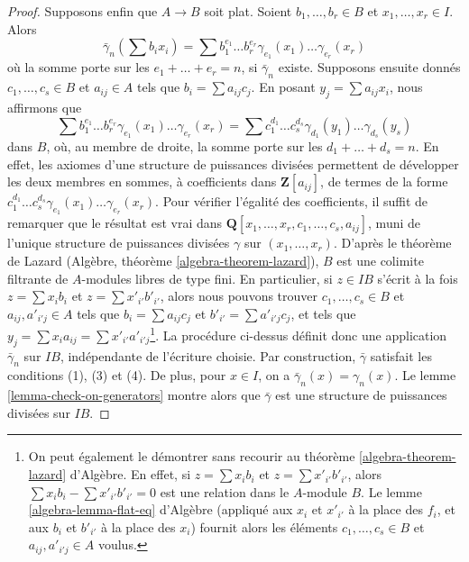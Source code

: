 \begin{proof}
Supposons enfin que $A \to B$ soit plat. Soient $b_1, \ldots, b_r \in B$ et
$x_1, \ldots, x_r \in I$. Alors
$$
\bar\gamma_n(\sum b_ix_i) =
\sum b_1^{e_1} \ldots b_r^{e_r} \gamma_{e_1}(x_1) \ldots \gamma_{e_r}(x_r)
$$
où la somme porte sur les $e_1 + \ldots + e_r = n$,
si $\bar\gamma_n$ existe. Supposons ensuite donnés $c_1, \ldots, c_s \in B$
et $a_{ij} \in A$ tels que $b_i = \sum a_{ij}c_j$. En posant $y_j = \sum a_{ij}x_i$, nous affirmons que
$$
\sum b_1^{e_1} \ldots b_r^{e_r} \gamma_{e_1}(x_1) \ldots \gamma_{e_r}(x_r) =
\sum c_1^{d_1} \ldots c_s^{d_s} \gamma_{d_1}(y_1) \ldots \gamma_{d_s}(y_s)
$$
dans $B$, où, au membre de droite, la somme porte sur les $d_1 + \ldots + d_s = n$. En effet, les axiomes d'une structure de puissances divisées permettent de développer les deux membres en sommes, à coefficients dans $\mathbf{Z}[a_{ij}]$, de termes de la forme
$c_1^{d_1} \ldots c_s^{d_s}\gamma_{e_1}(x_1) \ldots \gamma_{e_r}(x_r)$. Pour vérifier l'égalité des coefficients, il suffit de remarquer que le résultat est vrai dans $\mathbf{Q}[x_1, \ldots, x_r, c_1, \ldots, c_s, a_{ij}]$, muni de
l'unique structure de puissances divisées $\gamma$ sur $(x_1, \ldots, x_r)$. D'après le théorème de Lazard (Algèbre, théorème \ref{algebra-theorem-lazard}), $B$ est une colimite filtrante de $A$-modules libres de type fini. En particulier, si $z \in IB$ s'écrit à la fois $z = \sum x_ib_i$ et
$z = \sum x'_{i'}b'_{i'}$, alors nous pouvons trouver $c_1, \ldots, c_s \in B$
et $a_{ij}, a'_{i'j} \in A$ tels que $b_i = \sum a_{ij}c_j$
et $b'_{i'} = \sum a'_{i'j}c_j$, et tels que
$y_j = \sum x_ia_{ij} = \sum x'_{i'}a'_{i'j}$\footnote{On peut également le démontrer sans recourir au théorème \ref{algebra-theorem-lazard} d'Algèbre. En effet, si
$z = \sum x_ib_i$ et $z = \sum x'_{i'}b'_{i'}$, alors
$\sum x_ib_i - \sum x'_{i'}b'_{i'} = 0$ est une relation dans le
$A$-module $B$. Le lemme \ref{algebra-lemma-flat-eq} d'Algèbre
(appliqué aux $x_i$ et $x'_{i'}$ à la place des $f_i$, et aux $b_i$ et $b'_{i'}$ à la place des $x_i$) fournit alors les éléments $c_1, \ldots, c_s \in B$
et $a_{ij}, a'_{i'j} \in A$ voulus.}. La procédure ci-dessus définit donc une application $\bar\gamma_n$
sur $IB$, indépendante de l'écriture choisie. Par construction, $\bar\gamma$ satisfait les conditions (1), (3) et (4). De plus, pour $x \in I$, on a $\bar\gamma_n(x) = \gamma_n(x)$. Le lemme \ref{lemma-check-on-generators} montre alors que $\bar\gamma$
est une structure de puissances divisées sur $IB$.

\end{proof}

